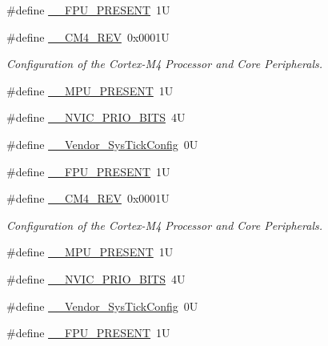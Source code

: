 \begin{DoxyCompactItemize}
\item 
\#define \hyperlink{group___configuration__section__for___c_m_s_i_s_gac1ba8a48ca926bddc88be9bfd7d42641}{\+\_\+\+\_\+\+F\+P\+U\+\_\+\+P\+R\+E\+S\+E\+NT}~1U
\item 
\#define \hyperlink{group___configuration__section__for___c_m_s_i_s_ga45a97e4bb8b6ce7c334acc5f45ace3ba}{\+\_\+\+\_\+\+C\+M4\+\_\+\+R\+EV}~0x0001U
\begin{DoxyCompactList}\small\item\em Configuration of the Cortex-\/\+M4 Processor and Core Peripherals. \end{DoxyCompactList}\item 
\#define \hyperlink{group___configuration__section__for___c_m_s_i_s_ga4127d1b31aaf336fab3d7329d117f448}{\+\_\+\+\_\+\+M\+P\+U\+\_\+\+P\+R\+E\+S\+E\+NT}~1U
\item 
\#define \hyperlink{group___configuration__section__for___c_m_s_i_s_gae3fe3587d5100c787e02102ce3944460}{\+\_\+\+\_\+\+N\+V\+I\+C\+\_\+\+P\+R\+I\+O\+\_\+\+B\+I\+TS}~4U
\item 
\#define \hyperlink{group___configuration__section__for___c_m_s_i_s_gab58771b4ec03f9bdddc84770f7c95c68}{\+\_\+\+\_\+\+Vendor\+\_\+\+Sys\+Tick\+Config}~0U
\item 
\#define \hyperlink{group___configuration__section__for___c_m_s_i_s_gac1ba8a48ca926bddc88be9bfd7d42641}{\+\_\+\+\_\+\+F\+P\+U\+\_\+\+P\+R\+E\+S\+E\+NT}~1U
\item 
\#define \hyperlink{group___configuration__section__for___c_m_s_i_s_ga45a97e4bb8b6ce7c334acc5f45ace3ba}{\+\_\+\+\_\+\+C\+M4\+\_\+\+R\+EV}~0x0001U
\begin{DoxyCompactList}\small\item\em Configuration of the Cortex-\/\+M4 Processor and Core Peripherals. \end{DoxyCompactList}\item 
\#define \hyperlink{group___configuration__section__for___c_m_s_i_s_ga4127d1b31aaf336fab3d7329d117f448}{\+\_\+\+\_\+\+M\+P\+U\+\_\+\+P\+R\+E\+S\+E\+NT}~1U
\item 
\#define \hyperlink{group___configuration__section__for___c_m_s_i_s_gae3fe3587d5100c787e02102ce3944460}{\+\_\+\+\_\+\+N\+V\+I\+C\+\_\+\+P\+R\+I\+O\+\_\+\+B\+I\+TS}~4U
\item 
\#define \hyperlink{group___configuration__section__for___c_m_s_i_s_gab58771b4ec03f9bdddc84770f7c95c68}{\+\_\+\+\_\+\+Vendor\+\_\+\+Sys\+Tick\+Config}~0U
\item 
\#define \hyperlink{group___configuration__section__for___c_m_s_i_s_gac1ba8a48ca926bddc88be9bfd7d42641}{\+\_\+\+\_\+\+F\+P\+U\+\_\+\+P\+R\+E\+S\+E\+NT}~1U

\end{DoxyCompactItemize}
